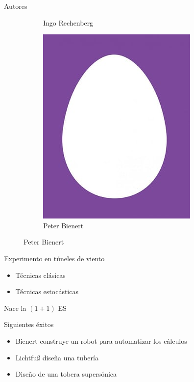 \documentclass[10pt]{beamer}
\begin{document}
\begin{frame}[fragile]{Autores}
\begin{figure}[htp]
\begin{subfigure}[b]{.3\textwidth}
      \caption*{Ingo Rechenberg}
    \end{subfigure}%
    \begin{subfigure}[b]{.3\textwidth}
      \includegraphics[width=.95\textwidth]{imgs/bienert.jpg}
      \caption*{Peter Bienert}
    \end{subfigure}
  \end{figure}

\end{frame}

\begin{frame}{Experimento en túneles de viento}
  \begin{itemize}\itemsep2pt
  \item Técnicas clásicas
  \item Técnicas estocásticas
  \end{itemize}

  \begin{center}
    Nace la $(1 + 1)$ ES
  \end{center}
\end{frame}

\begin{frame}{Siguientes éxitos}
  \begin{itemize}\itemsep2pt
  \item Bienert construye un robot para automatizar los cálculos
  \item Lichtfu{\ss} diseña una tubería
  \item Diseño de una tobera supersónica
  \end{itemize}
\end{frame}
\end{document}

